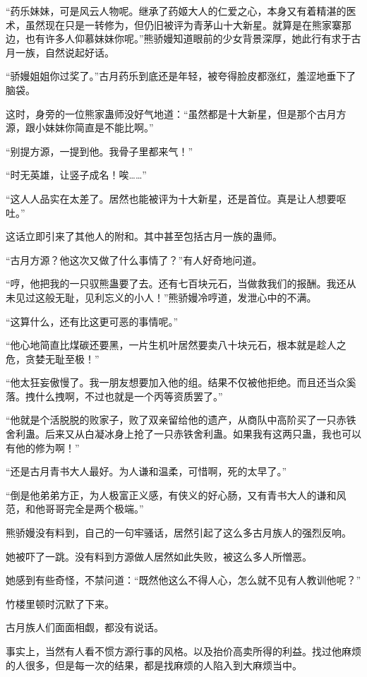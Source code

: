 \begin{this_body}
“药乐妹妹，可是风云人物呢。继承了药姬大人的仁爱之心，本身又有着精湛的医术，虽然现在只是一转修为，但仍旧被评为青茅山十大新星。就算是在熊家寨那边，也有许多人仰慕妹妹你呢。”熊骄嫚知道眼前的少女背景深厚，她此行有求于古月一族，自然说起好话。

“骄嫚姐姐你过奖了。”古月药乐到底还是年轻，被夸得脸皮都涨红，羞涩地垂下了脑袋。

这时，身旁的一位熊家蛊师没好气地道：“虽然都是十大新星，但是那个古月方源，跟小妹妹你简直是不能比啊。”

“别提方源，一提到他。我骨子里都来气！”

“时无英雄，让竖子成名！唉……”

“这人人品实在太差了。居然也能被评为十大新星，还是首位。真是让人想要呕吐。”

这话立即引来了其他人的附和。其中甚至包括古月一族的蛊师。

“古月方源？他这次又做了什么事情了？”有人好奇地问道。

“哼，他把我的一只驭熊蛊要了去。还有七百块元石，当做救我们的报酬。我还从未见过这般无耻，见利忘义的小人！”熊骄嫚冷哼道，发泄心中的不满。

“这算什么，还有比这更可恶的事情呢。”

“他心地简直比煤碳还要黑，一片生机叶居然要卖八十块元石，根本就是趁人之危，贪婪无耻至极！”

“他太狂妄傲慢了。我一朋友想要加入他的组。结果不仅被他拒绝。而且还当众奚落。拽什么拽啊，不过也就是一个丙等资质罢了。”

“他就是个活脱脱的败家子，败了双亲留给他的遗产，从商队中高阶买了一只赤铁舍利蛊。后来又从白凝冰身上抢了一只赤铁舍利蛊。如果我有这两只蛊，我也可以有他的修为啊！”

“还是古月青书大人最好。为人谦和温柔，可惜啊，死的太早了。”

“倒是他弟弟方正，为人极富正义感，有侠义的好心肠，又有青书大人的谦和风范，和他哥哥完全是两个极端。”

熊骄嫚没有料到，自己的一句牢骚话，居然引起了这么多古月族人的强烈反响。

她被吓了一跳。没有料到方源做人居然如此失败，被这么多人所憎恶。

她感到有些奇怪，不禁问道：“既然他这么不得人心，怎么就不见有人教训他呢？”

竹楼里顿时沉默了下来。

古月族人们面面相觑，都没有说话。

事实上，当然有人看不惯方源行事的风格。以及抬价高卖所得的利益。找过他麻烦的人很多，但是每一次的结果，都是找麻烦的人陷入到大麻烦当中。


\end{this_body}
